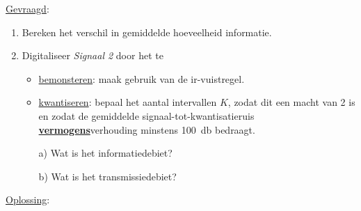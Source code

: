 \documentclass[kulak]{kulakarticle}
\begin{document}
	\underline{Gevraagd}:
	\begin{enumerate}
		\item Bereken het verschil in gemiddelde hoeveelheid informatie.
		\item Digitaliseer \textit{Signaal 2} door het te
		\begin{itemize}
			\item \underline{bemonsteren}: maak gebruik van de ir-vuistregel.
			\item \underline{kwantiseren}: bepaal het aantal intervallen \( K \), zodat dit een macht van 2 is en zodat de gemiddelde signaal-tot-kwantisatieruis \underline{\textbf{vermogens}}verhouding minstens \SI{100}{\decibel} bedraagt.
		\end{itemize}
		\begin{enumerate}
			\item[a)] Wat is het informatiedebiet?
			\item[b)] Wat is het transmissiedebiet?
		\end{enumerate}
	\end{enumerate}

	\underline{Oplossing}:
\end{document}
